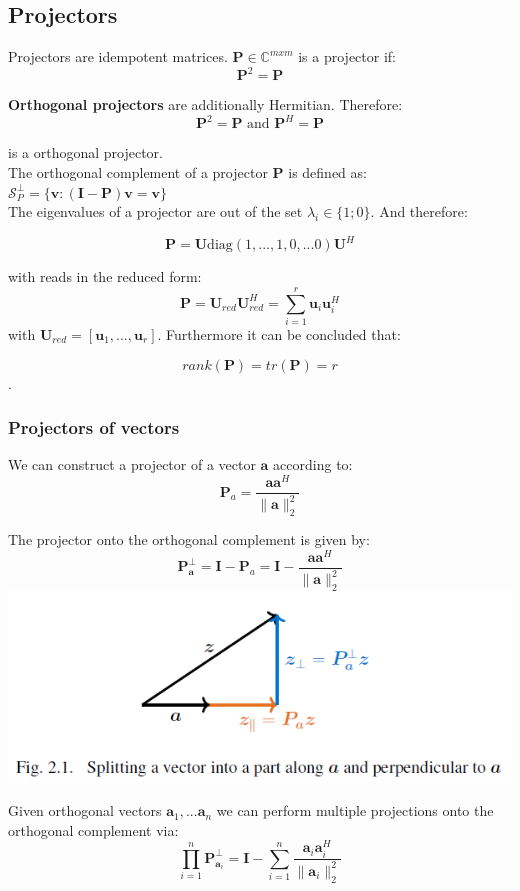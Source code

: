 \documentclass[english]{latex4ei/latex4ei_sheet}
\begin{document}
\begin{sectionbox}
\subsection{Projectors}
Projectors are idempotent matrices. $\mathbf{P} \in \mathbb{C}^{mxm}$ is a projector if:\\
$$\mathbf{P}^2 = \mathbf{P}$$

\textbf{Orthogonal projectors} are additionally Hermitian. Therefore:\\
$$\mathbf{P}^2 = \mathbf{P} \text{ and } \mathbf{P}^H=\mathbf{P}$$

is a orthogonal projector.\\

The orthogonal complement of a projector $\mathbf{P}$ is defined as:\\
$\mathcal{S}_P^\perp = \{\mathbf{v}: (\mathbf{I}-\mathbf{P})\mathbf{v}=\mathbf{v}\}$\\

The eigenvalues of a projector are out of the set $\lambda_i\in\{1;0\}$. And therefore:

$$\mathbf{P} = \mathbf{U}\text{diag}(1,...,1,0,...0)\mathbf{U}^H$$

with reads in the reduced form:
$$\mathbf{P} = \mathbf{U}_{red}\mathbf{U}_{red}^H = \sum_{i=1}^{r}\mathbf{u}_i\mathbf{u}_i^H$$
with $\mathbf{U}_{red} = [\mathbf{u}_1,...,\mathbf{u}_r]$. 
Furthermore it can be concluded that:

$$rank(\mathbf{P}) = tr(\mathbf{P}) =r$$.
\end{sectionbox}
\begin{sectionbox}
\subsubsection{Projectors of vectors}
We can construct a projector of a vector $\mathbf{a}$ according to:
$$\mathbf{P}_a = \frac{\mathbf{a}\mathbf{a}^H}{\parallel\mathbf{a}\parallel^2_2}$$

The projector onto the orthogonal complement is given by:
$$\mathbf{P}^\perp_\mathbf{a} = \mathbf{I}-\mathbf{P}_a = \mathbf{I} - \frac{\mathbf{a}\mathbf{a}^H}{\parallel\mathbf{a}\parallel^2_2}$$
\includegraphics[width=\textwidth]{img/vector_decomp.png}

Given orthogonal vectors $\mathbf{a}_1, ... \mathbf{a}_n$ we can perform multiple projections onto the orthogonal complement via:\\
$$\prod_{i=1}^n \mathbf{P}_{\mathbf{a}_i}^\perp = \mathbf{I} - \sum_{i=1}^{n}\frac{\mathbf{a}_i\mathbf{a}_i^H}{\parallel\mathbf{a}_i\parallel^2_2}$$
\end{sectionbox}
\end{document}
